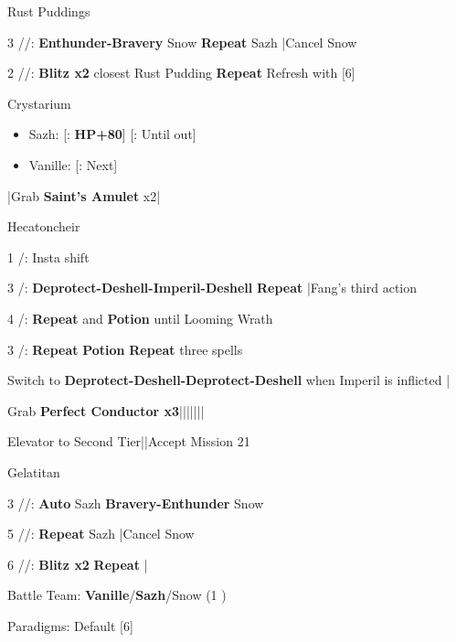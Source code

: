 \begin{fight}{Rust Puddings}
	\item [3] \syn/\med/\com: \textbf{Enthunder-Bravery} Snow \to \textbf{Repeat} Sazh |Cancel Snow
	\item [2] \com/\med/\com: \textbf{Blitz x2} closest Rust Pudding \to \textbf{Repeat} \to Refresh with [6]
\end{fight}
\begin{menu}
	\item Crystarium
	\begin{itemize}
		\item Sazh: [\com: \textbf{HP+80}] [\rav: Until out]
		\item Vanille: [\med: Next]
	\end{itemize}
\end{menu}
\begin{mainlist}
	\item \skip|Grab \textbf{Saint's Amulet} x2|\skip
\end{mainlist}
\begin{fight}{Hecatoncheir}
	\item [1] \com/\rav: Insta shift
	\item [3] \sab/\com: \textbf{Deprotect-Deshell-Imperil-Deshell} \to \textbf{Repeat} |Fang's third action
	\item [4] \sab/\sen: \textbf{Repeat} and \textbf{Potion} until Looming Wrath
	\item [3] \sab/\com: \textbf{Repeat} \to \textbf{Potion} \to \textbf{Repeat} three spells
	\item Switch to \textbf{Deprotect-Deshell-Deprotect-Deshell} when Imperil is inflicted |\skip
\end{fight}
\begin{mainlist}
	\item Grab \textbf{Perfect Conductor x3}|\skip||||\skip|\skip|\skip
	\item Elevator to Second Tier|\skip|Accept Mission 21
\end{mainlist}
\begin{fight}{Gelatitan}
	\item [3] \syn/\med/\com: \textbf{Auto} Sazh \to \textbf{Bravery-Enthunder} Snow
	\item [5] \syn/\sab/\com: \textbf{Repeat} Sazh |Cancel Snow
	\item [6] \com/\rav/\com: \textbf{Blitz x2} \to \textbf{Repeat} |\skip
\end{fight}
\begin{menu}
	\item Battle Team: \textbf{Vanille}/\textbf{Sazh}/Snow (1 )
	\item Paradigms: Default [6]
\end{menu}
